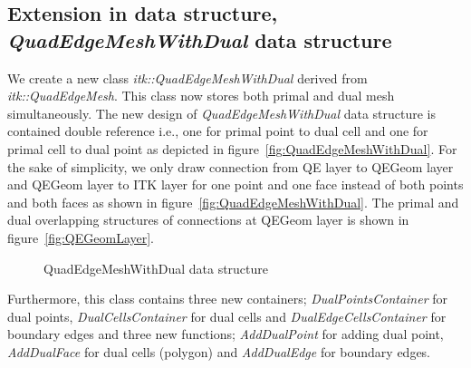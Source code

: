 \documentclass{InsightArticle}
\begin{document}
\subsection{Extension in data structure, \emph{QuadEdgeMeshWithDual} data structure}
We create a new class \emph{itk::QuadEdgeMeshWithDual} derived from \emph{itk::QuadEdgeMesh}. This class now stores both primal and dual mesh simultaneously. The new design of \emph{QuadEdgeMeshWithDual} data structure is contained double reference i.e., one for primal point to dual cell and one for primal cell to dual point as depicted in figure~\ref{fig:QuadEdgeMeshWithDual}. For the sake of simplicity, we only draw connection from QE layer to QEGeom layer and QEGeom layer to ITK layer for one point and one face instead of both points and both faces as shown in figure~\ref{fig:QuadEdgeMeshWithDual}. The primal and dual overlapping structures of connections at QEGeom layer is shown in figure~\ref{fig:QEGeomLayer}.
\begin{figure}
	\centering
	\caption{QuadEdgeMeshWithDual data structure}
	\label{fig:QuadEdgeMeshWithDualFull}
\end{figure}
Furthermore, this class contains three new containers; \emph{DualPointsContainer} for dual points, \emph{DualCellsContainer} for dual cells and \emph{DualEdgeCellsContainer} for boundary edges and three new functions; \emph{AddDualPoint} for adding dual point, \emph{AddDualFace} for dual cells (polygon) and \emph{AddDualEdge} for boundary edges. 
\end{document}
